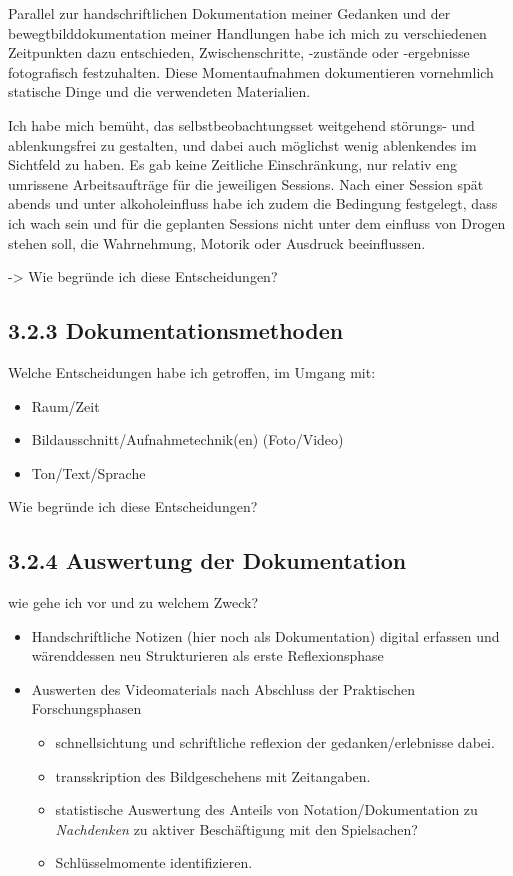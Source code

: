 \documentclass[11pt,a4paper,twoside]{scrreprt}
\begin{document}
Parallel zur handschriftlichen Dokumentation meiner Gedanken und der bewegtbilddokumentation meiner Handlungen habe ich mich zu verschiedenen Zeitpunkten dazu entschieden, Zwischenschritte, -zustände oder -ergebnisse fotografisch festzuhalten. Diese Momentaufnahmen dokumentieren vornehmlich statische Dinge und die verwendeten Materialien. 

Ich habe mich bemüht, das selbstbeobachtungsset weitgehend störungs- und  ablenkungsfrei zu gestalten, und dabei auch möglichst wenig ablenkendes im Sichtfeld zu haben. Es gab keine Zeitliche Einschränkung, nur relativ eng umrissene Arbeitsaufträge für die jeweiligen Sessions. Nach einer Session spät abends und unter alkoholeinfluss habe ich zudem die Bedingung festgelegt, dass ich wach sein und für die geplanten Sessions nicht unter dem einfluss von Drogen stehen soll, die Wahrnehmung, Motorik oder Ausdruck beeinflussen.

-> 
Wie begründe ich diese Entscheidungen?

		\subsection{3.2.3 Dokumentationsmethoden}
			Welche Entscheidungen habe ich getroffen, im Umgang mit:
			\begin{itemize}
				\item Raum/Zeit
				\item Bildausschnitt/Aufnahmetechnik(en) (Foto/Video)
				\item Ton/Text/Sprache
			\end{itemize}
    			Wie begründe ich diese Entscheidungen?

		\subsection{3.2.4 Auswertung der Dokumentation}
			wie gehe ich vor und zu welchem Zweck?
			\begin{itemize}
				\item Handschriftliche Notizen (hier noch als Dokumentation) digital erfassen und wärenddessen neu Strukturieren als erste Reflexionsphase
				\item Auswerten des Videomaterials nach Abschluss der Praktischen Forschungsphasen
				\begin{itemize}
					\item schnellsichtung und schriftliche reflexion der gedanken/erlebnisse dabei.
					\item transskription des Bildgeschehens mit Zeitangaben. 
					\item statistische Auswertung des Anteils von Notation/Dokumentation zu \textit{Nachdenken} zu aktiver Beschäftigung mit den Spielsachen?
					\item Schlüsselmomente identifizieren.
				\end{itemize}
			\end{itemize}
\end{document}
